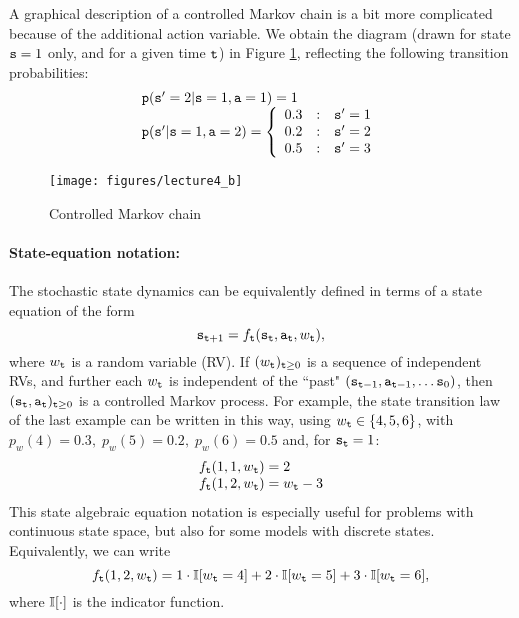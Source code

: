 A graphical description of a controlled Markov chain is a bit more
complicated because of the additional action variable. We obtain the
diagram (drawn for state ${\tt s} = 1$ only, and for a given time
${\tt t}$) in Figure \ref{fig:MDP}, reflecting the following
transition probabilities:
\[\begin{array}{l}
\transitionprob(\state' = 2|\state = 1,\action = 1) = 1\\
\transitionprob(\state'|\state = 1,\action = 2) = \left\{ {\begin{array}{*{20}{c}}
{0.3}&:&{\state' = 1}\\
{0.2}&:&{\state' = 2}\\
{0.5}&:&{\state' = 3}
\end{array}} \right.
\end{array}\]

\begin{figure}
  \begin{centering}
  \texttt{[image: figures/lecture4\_b]}\\
  \caption{Controlled Markov chain}\label{fig:MDP}
  \end{centering}
\end{figure}


\paragraph{State-equation notation:}
The stochastic state dynamics can be equivalently defined in terms of a state equation of the form
                                                   \[{{\tt s}_{{\tt t} + 1}} = {f_{\tt t}}({{\tt s}_{\tt t}},{{\tt a}_{\tt t}},{w_{\tt t}}),\]
where ${w_{\tt t}}$ is a random variable (RV).
    If  ${({w_{\tt t}})_{{\tt t} \ge 0}}$ is a sequence of independent RVs, and further each ${w_{\tt t}}$ is independent of the ``past"  $({{\tt s}_{{\tt t} - 1}},{{\tt a}_{{\tt t} - 1}}, \ldots {{\tt s}_0})$, then ${({{\tt s}_{\tt t}},{{\tt a}_{\tt t}})_{{\tt t} \ge 0}}$ is a controlled Markov process.
    For example, the state transition law of the last example can be written in this way, using
                  ${w_{\tt t}} \in \{ 4,5,6\} $,  with  ${p_w}(4) = 0.3,\;{p_w}(5) = 0.2,\;{p_w}(6) = 0.5$
and, for ${{\tt s}_{\tt t}} = 1$:
    \[\begin{array}{l}
    {f_{\tt t}}(1,1,{w_{\tt t}}) = 2\\
    {f_{\tt t}}(1,2,{w_{\tt t}}) = {w_{\tt t}} - 3
    \end{array}\]
  This state algebraic equation notation is especially useful for problems with continuous state space, but also for some models with discrete states.
Equivalently, we can write
    \[
 {f_{\tt t}}(1,2,{w_{\tt t}}) = 1\cdot \mathbb{I}[{w_{\tt t}}=4]+2\cdot \mathbb{I}[{w_{\tt t}}=5]+3\cdot \mathbb{I}[{w_{\tt t}}=6] ,
    \]
where $\mathbb{I}[\cdot]$ is the indicator function.

